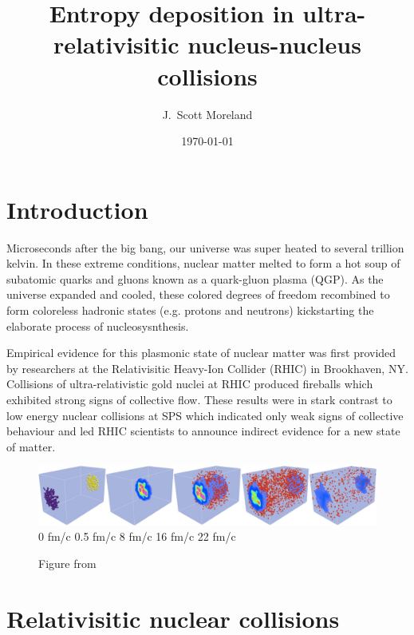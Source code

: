 \documentclass[aps,prc,reprint,amsmath,nofootinbib]{revtex4-1}
\begin{document}
\title{Entropy deposition in ultra-relativisitic nucleus-nucleus collisions}

\author{J.\ Scott Moreland}
\date{\today}

\maketitle

\section{Introduction}

Microseconds after the big bang, our universe was super heated to several trillion kelvin. In these extreme conditions, nuclear matter melted to form a hot 
soup of subatomic quarks and gluons known as a quark-gluon plasma (QGP). As the universe expanded and cooled, these colored degrees of freedom recombined to 
form coloreless hadronic states (e.g. protons and neutrons) kickstarting the elaborate process of nucleosysnthesis.

Empirical evidence for this plasmonic state of nuclear matter was first provided by researchers at the Relativisitic Heavy-Ion Collider (RHIC) in Brookhaven, NY.
Collisions of ultra-relativistic gold nuclei at RHIC produced fireballs which exhibited strong signs of collective flow. These results were in stark contrast 
to low energy nuclear collisions at SPS which indicated only weak signs of collective behaviour and led RHIC scientists to announce indirect evidence for a new state
of matter.



\begin{figure}[t]
  \centering
  \includegraphics[width=\textwidth]{evolution} \\
  0 fm/c   \hspace{.13\textwidth}
  0.5 fm/c \hspace{.13\textwidth}
  8 fm/c   \hspace{.13\textwidth}
  16 fm/c  \hspace{.13\textwidth}
  22 fm/c
  \caption{Figure from \cite{iss}}
  \label{fig:coll}
\end{figure}

\section{Relativisitic nuclear collisions}
\end{document}
